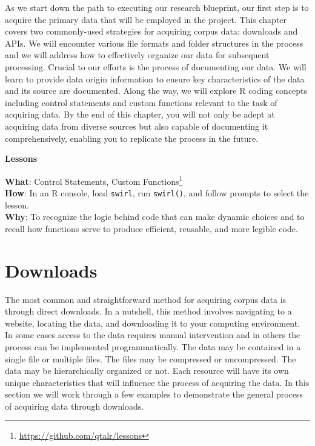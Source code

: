 \documentclass[
  letterpaper,
]{latex/krantz}
\theoremstyle{definition}
\theoremstyle{remark}
\DeclareRobustCommand{\href}[2]{#2\footnote{\url{#1}}}
\begin{document}
As we start down the path to executing our research blueprint, our first
step is to acquire the primary data that will be employed in the
project. This chapter covers two commonly-used strategies for acquiring
corpus data: downloads and APIs. We will encounter various file formats
and folder structures in the process and we will address how to
effectively organize our data for subsequent processing. Crucial to our
efforts is the process of documenting our data. We will learn to provide
data origin information to ensure key characteristics of the data and
its source are documented. Along the way, we will explore R coding
concepts including control statements and custom functions relevant to
the task of acquiring data. By the end of this chapter, you will not
only be adept at acquiring data from diverse sources but also capable of
documenting it comprehensively, enabling you to replicate the process in
the future.

\begin{tcolorbox}[enhanced jigsaw, toprule=.15mm, breakable, colback=white, opacityback=0, leftrule=.75mm, bottomrule=.15mm, colframe=quarto-callout-color-frame, left=2mm, arc=.35mm, rightrule=.15mm]

\textbf{ Lessons}

\textbf{What}: \href{https://github.com/qtalr/lessons}{Control
Statements, Custom Functions}\\
\textbf{How}: In an R console, load \texttt{swirl}, run
\texttt{swirl()}, and follow prompts to select the lesson.\\
\textbf{Why}: To recognize the logic behind code that can make dynamic
choices and to recall how functions serve to produce efficient,
reusable, and more legible code.

\end{tcolorbox}

\section{Downloads}\label{downloads}

The most common and straightforward method for acquiring corpus data is
through direct downloads. In a nutshell, this method involves navigating
to a website, locating the data, and downloading it to your computing
environment. In some cases access to the data requires manual
intervention and in others the process can be implemented
programmatically. The data may be contained in a single file or multiple
files. The files may be compressed or uncompressed. The data may be
hierarchically organized or not. Each resource will have its own unique
characteristics that will influence the process of acquiring the data.
In this section we will work through a few examples to demonstrate the
general process of acquiring data through downloads.
\end{document}
